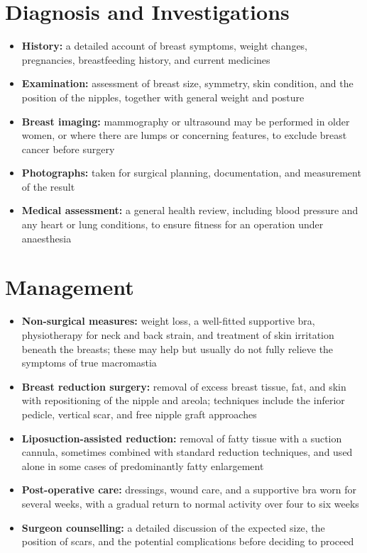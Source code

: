 \section*{Diagnosis and Investigations}
\begin{itemize}
    \item \textbf{History:} a detailed account of breast symptoms, weight changes, pregnancies, breastfeeding history, and current medicines
    \item \textbf{Examination:} assessment of breast size, symmetry, skin condition, and the position of the nipples, together with general weight and posture
    \item \textbf{Breast imaging:} mammography or ultrasound may be performed in older women, or where there are lumps or concerning features, to exclude breast cancer before surgery
    \item \textbf{Photographs:} taken for surgical planning, documentation, and measurement of the result
    \item \textbf{Medical assessment:} a general health review, including blood pressure and any heart or lung conditions, to ensure fitness for an operation under anaesthesia
\end{itemize}

\section*{Management}
\begin{itemize}
    \item \textbf{Non-surgical measures:} weight loss, a well-fitted supportive bra, physiotherapy for neck and back strain, and treatment of skin irritation beneath the breasts; these may help but usually do not fully relieve the symptoms of true macromastia
    \item \textbf{Breast reduction surgery:} removal of excess breast tissue, fat, and skin with repositioning of the nipple and areola; techniques include the inferior pedicle, vertical scar, and free nipple graft approaches
    \item \textbf{Liposuction-assisted reduction:} removal of fatty tissue with a suction cannula, sometimes combined with standard reduction techniques, and used alone in some cases of predominantly fatty enlargement
    \item \textbf{Post-operative care:} dressings, wound care, and a supportive bra worn for several weeks, with a gradual return to normal activity over four to six weeks
    \item \textbf{Surgeon counselling:} a detailed discussion of the expected size, the position of scars, and the potential complications before deciding to proceed
\end{itemize}

